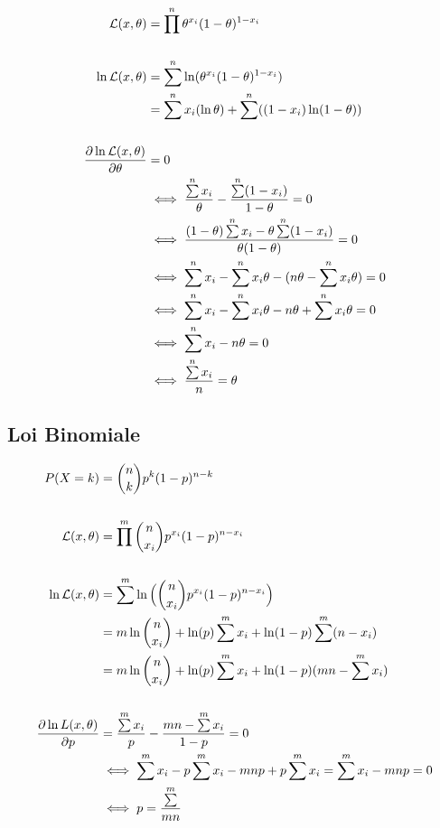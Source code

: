 \documentclass{article}
\begin{document}
\begin{align*}
    \likelihood(x, \theta) &= \prod\limits^n \theta^{x_i}(1 - \theta)^{1 - x_i} \\ \\
    \ln \likelihood(x, \theta) &= \sum\limits^n \ln(\theta^{x_i}(1 - \theta)^{1 - x_i}) \\
    &= \sum\limits^n x_i (\ln\theta) + \sum\limits^n ((1-x_i) \ln(1-\theta)) \\ \\
    \frac{\partial \ln \likelihood(x, \theta)}{\partial \theta} &= 0 \\
    &\iff \frac{\sum\limits^n x_i}{\theta} - \frac{\sum\limits^n (1-x_i)}{1 - \theta} = 0 \\
    &\iff \frac{(1 - \theta) \sum\limits^n x_i - \theta \sum\limits^n (1 - x_i)}{\theta (1 - \theta)} = 0 \\
    &\iff \sum\limits^n x_i - \sum\limits^n x_i \theta - (n\theta - \sum\limits^n x_i\theta) = 0 \\
    &\iff \sum\limits^n x_i - \sum\limits^n x_i \theta -  n\theta + \sum\limits^n x_i\theta  = 0 \\
    &\iff \sum\limits^n x_i - n\theta = 0 \\
    &\iff \frac{\sum\limits^n x_i}{n} = \theta
\end{align*}

\subsection{Loi Binomiale}

\begin{align*}
    P(X=k) &= \dbinom{n}{k}p^k(1-p)^{n-k} \\
    \\
    {\cal L}(x, \theta) &= \prod\limits^m \dbinom{n}{x_i}p^{x_i}(1-p)^{n-x_i} \\
    \\
    \ln {\cal L}(x, \theta) &= \sum\limits^m \ln \Big( \dbinom{n}{x_i}p^{x_i}(1-p)^{n-x_i} \Big) \\
    &= m \ln \dbinom{n}{x_i} + \ln(p) \sum\limits^m x_i + \ln(1-p)\sum\limits^m(n-x_i) \\
    &= m \ln \dbinom{n}{x_i} + \ln(p) \sum\limits^m x_i + \ln(1-p)(mn - \sum\limits^m x_i) \\
    \\
    \frac{\partial \ln L(x, \theta)}{\partial p} &= \frac{\sum\limits^m x_i}{p} - \frac{mn - \sum\limits^m x_i}{1 - p} = 0 \\
    &\iff \sum\limits^m x_i - p \sum\limits^m x_i - mnp + p \sum\limits^m x_i = \sum\limits^m x_i - mnp = 0 \\
    &\iff p = \frac{\sum\limits^m}{mn}
\end{align*}
\end{document}
